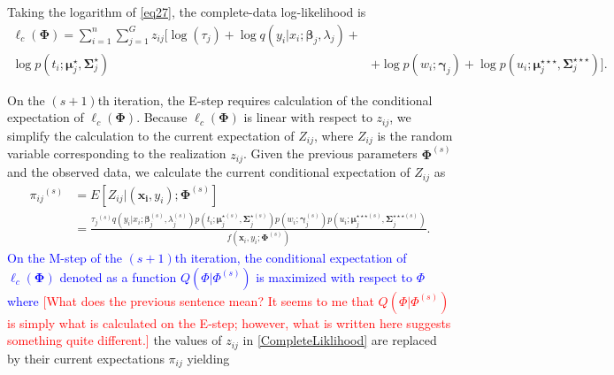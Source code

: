 \documentclass[11pt,letterpaper]{article}
\numberwithin{equation}{section}
\numberwithin{equation}{section}
\numberwithin{equation}{section}
\begin{document}
%
Taking the logarithm of \eqref{eq27}, the complete-data log-likelihood is 
\begin{equation}\begin{split}
\ell_c(\bm\Phi)= \sum_{i=1}^{n}\sum_{j=1}^{G}{z_{ij}}\big[\log(\tau_{j}) + \log{q}(y_i|x_i; \bm{\beta}_j,\lambda_j)+& \\ \log p(t_i; \bm{\mu}_j^{\star}, \bm{\Sigma}_j^{\star}) & + \log p(w_i; \bm{\gamma}_j) +\log {p}(u_i; \bm{\mu}_j^{\star\star\star},\bm{\Sigma}_j^{\star\star\star}) \big].
\label{CompleteLiklihood}
\end{split}\end{equation}

On the $(s+1)$th iteration, the E-step requires calculation of the conditional expectation of $\ell_c(\bm\Phi)$. Because $\ell_c(\bm\Phi)$ is linear with respect to  $z_{ij}$, we simplify the calculation to the current expectation of $Z_{ij}$, where $Z_{ij}$ is the random variable corresponding to the realization $z_{ij}$. Given the previous parameters $\bm\Phi^{(s)}$ and the observed data,  we calculate the current conditional expectation of $Z_{ij}$ as
\begin{equation*}\begin{split}
    {\pi_{ij}}^{(s)} &= {E}[Z_{ij} |(\bm{x_i}, y_i); \bm{\Phi}^{(s)}]\\
     &= \frac{{\tau_j}^{(s)}q(y_i|x_i; \bm \beta_j^{(s)}, \lambda^{(s)}_{j})p(t_i; \bm\mu_j^{{\star}(s)}, \bm\Sigma_j^{{\star}(s)}) p(w_i; \bm \gamma_j^{(s)})p(u_i; \bm{\mu}_j^{\star\star\star (s)},\bm{\Sigma}_j^{\star\star\star (s)})}{f(\bm{x}_i, y_i; \bm{\Phi}^{(s)})
\label{eq29}                       }.
\end{split}\end{equation*}
%
\textcolor{blue}{On the M-step of the $(s+1)$th iteration, the conditional expectation of $\ell_c(\bm\Phi)$ denoted as a function $Q(\Phi|\Phi^{(s)})$ is maximized with respect to $\Phi $ where}  \textcolor{red}{[What does the previous sentence mean? It seems to me that $Q(\Phi|\Phi^{(s)})$ is simply what is calculated on the E-step; however, what is written here suggests something quite different.]} the values of $z_{ij}$ in \eqref{CompleteLiklihood} are replaced by their current expectations $\pi_{ij}$ yielding 
\end{document}
